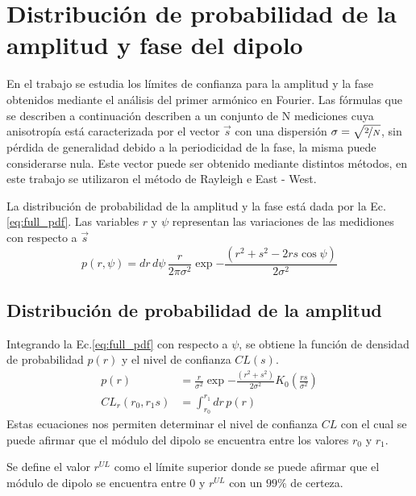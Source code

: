 \chapter{Distribución de probabilidad de la amplitud y fase del dipolo}

En el trabajo \cite{linsley1975fluctuation} se estudia los límites de confianza para la amplitud y la fase obtenidos mediante el análisis del primer armónico en Fourier. Las fórmulas que se describen a continuación describen a un conjunto de N mediciones cuya anisotropía está caracterizada por el vector $\vec{s}$ con una dispersión $\sigma = \sqrt{\nicefrac{2}{N}}$, sin pérdida de generalidad debido a la periodicidad de la fase, la misma puede considerarse nula. Este vector puede ser obtenido mediante distintos métodos, en este trabajo se  utilizaron el método de Rayleigh e East - West.

La distribución de probabilidad de la amplitud y la fase está dada por la Ec.\ref{eq:full_pdf}. Las variables $r$ y $\psi$ representan las variaciones de las medidiones con respecto a $\vec{s}$
\begin{equation}
    p(r,\psi) =dr\,d\psi\,\frac{r}{2\pi\sigma^2}\exp{ -\frac{(r^2+s^2 - 2rs\cos\psi)}{2\sigma^2} } \label{eq:full_pdf}
\end{equation}  

\section{Distribución de probabilidad de la amplitud}

Integrando la Ec.\ref{eq:full_pdf} con respecto a $\psi$, se obtiene la función de densidad de probabilidad $p(r)$ y el nivel de confianza $CL(s)$.
\begin{align}
    p(r) &=\frac{r}{\sigma^2}\exp{ -\frac{(r^2+s^2)}{2\sigma^2} }K_0(\frac{rs}{\sigma^2})    \label{ec:pdf}\\
    CL_r(r_0,r_1s) &= \int_{r_0}^{r_1} dr \, p(r)
    \label{ec:integral}
\end{align}  
Estas ecuaciones nos permiten determinar el nivel de confianza $CL$ con el cual se puede afirmar que el módulo del dipolo se encuentra entre los valores $r_0$ y $r_1$.

Se define el valor $r^{UL}$ como el límite superior donde se  puede afirmar que el módulo de dipolo se encuentra entre 0 y $r^{UL}$ con un $99\%$ de certeza.

